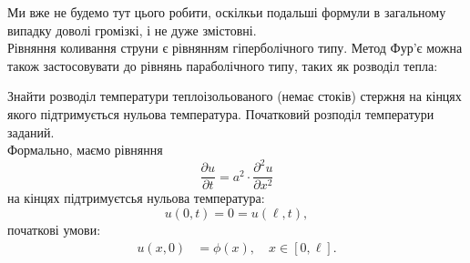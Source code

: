 Ми вже не будемо тут цього робити, оскілкьи подальші формули в загальному випадку доволі громізкі, і не дуже змістовні. \\

Рівняння коливання струни є рівнянням гіперболічного типу. Метод Фур'є можна також застосовувати до рівнянь параболічного типу, таких як розводіл тепла:

\begin{problem*}
	Знайти розводіл температури теплоізольованого (немає стоків) стержня на кінцях якого підтримується нульова температура. Початковий розподіл температури заданий. \\

	Формально, маємо рівняння
	\begin{equation}
		\label{eq:1-parabolic}
		\frac{\partial u}{\partial t} = a^2 \cdot \frac{\partial^2 u}{\partial x^2}
	\end{equation}
	на кінцях підтримуєтсья нульова температура:
	\begin{equation}
		\label{eq:2-parabolic}
		u(0, t) = 0 = u(\ell, t),
	\end{equation}
	початкові умови:
	\begin{align}
		\label{eq:3-parabolic}
		u(x, 0) &= \phi(x), \quad x \in [0, \ell].
	\end{align}
\end{problem*}

